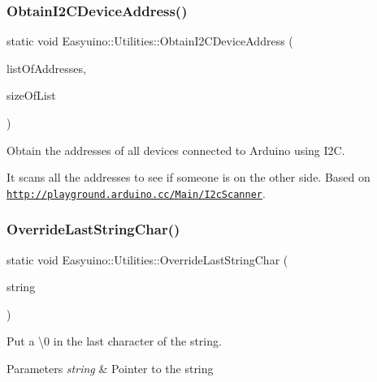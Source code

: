 \subsubsection{\texorpdfstring{Obtain\+I2\+C\+Device\+Address()}{ObtainI2CDeviceAddress()}}
{\footnotesize\ttfamily static void Easyuino\+::\+Utilities\+::\+Obtain\+I2\+C\+Device\+Address (\begin{DoxyParamCaption}\item[{I\+N\+O\+UT int $\ast$}]{list\+Of\+Addresses,  }\item[{IN uint8\+\_\+t}]{size\+Of\+List }\end{DoxyParamCaption})\hspace{0.3cm}{\ttfamily [static]}}



Obtain the addresses of all devices connected to Arduino using I2C. 

It scans all the addresses to see if someone is on the other side. Based on \href{http://playground.arduino.cc/Main/I2cScanner}{\tt http\+://playground.\+arduino.\+cc/\+Main/\+I2c\+Scanner}. \mbox{\label{class_easyuino_1_1_utilities_a4d7f4573ee544e72da2945f18d043704}} 
\subsubsection{\texorpdfstring{Override\+Last\+String\+Char()}{OverrideLastStringChar()}}
{\footnotesize\ttfamily static void Easyuino\+::\+Utilities\+::\+Override\+Last\+String\+Char (\begin{DoxyParamCaption}\item[{IN char $\ast$}]{string }\end{DoxyParamCaption})\hspace{0.3cm}{\ttfamily [static]}}



Put a \textbackslash{}0 in the last character of the string. 


\begin{DoxyParams}{Parameters}
{\em string} & Pointer to the string \\
\hline
\end{DoxyParams}
\mbox{\label{class_easyuino_1_1_utilities_a8f5da1e6939a43f10702b16c2fdeb8e0}} 
